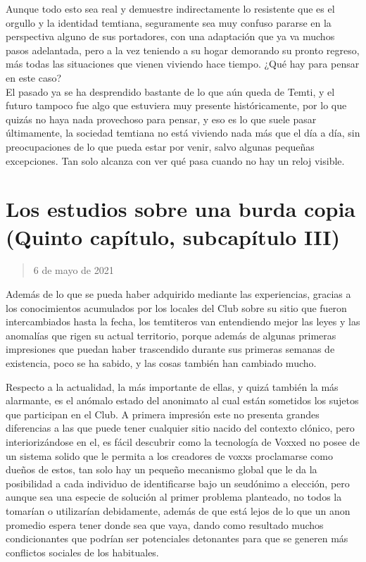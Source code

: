 \documentclass[
  spanish,
]{book}
\begin{document}
Aunque todo esto sea real y demuestre indirectamente lo resistente que es el orgullo y la identidad temtiana, seguramente sea muy confuso pararse en la perspectiva alguno de sus portadores, con una adaptación que ya va muchos pasos adelantada, pero a la vez teniendo a su hogar demorando su pronto regreso, más todas las situaciones que vienen viviendo hace tiempo. ¿Qué hay para pensar en este caso?\\
El pasado ya se ha desprendido bastante de lo que aún queda de Temti, y el futuro tampoco fue algo que estuviera muy presente históricamente, por lo que quizás no haya nada provechoso para pensar, y eso es lo que suele pasar últimamente, la sociedad temtiana no está viviendo nada más que el día a día, sin preocupaciones de lo que pueda estar por venir, salvo algunas pequeñas excepciones. Tan solo alcanza con ver qué pasa cuando no hay un reloj visible.

\hypertarget{los-estudios-sobre-una-burda-copia-quinto-capuxedtulo-subcapuxedtulo-iii}{%
\section{Los estudios sobre una burda copia (Quinto capítulo, subcapítulo III)}\label{los-estudios-sobre-una-burda-copia-quinto-capuxedtulo-subcapuxedtulo-iii}}

\begin{quote}
6 de mayo de 2021
\end{quote}

Además de lo que se pueda haber adquirido mediante las experiencias, gracias a los conocimientos acumulados por los locales del Club sobre su sitio que fueron intercambiados hasta la fecha, los temtiteros van entendiendo mejor las leyes y las anomalías que rigen su actual territorio, porque además de algunas primeras impresiones que puedan haber trascendido durante sus primeras semanas de existencia, poco se ha sabido, y las cosas también han cambiado mucho.

Respecto a la actualidad, la más importante de ellas, y quizá también la más alarmante, es el anómalo estado del anonimato al cual están sometidos los sujetos que participan en el Club. A primera impresión este no presenta grandes diferencias a las que puede tener cualquier sitio nacido del contexto clónico, pero interiorizándose en el, es fácil descubrir como la tecnología de Voxxed no posee de un sistema solido que le permita a los creadores de voxxs proclamarse como dueños de estos, tan solo hay un pequeño mecanismo global que le da la posibilidad a cada individuo de identificarse bajo un seudónimo a elección, pero aunque sea una especie de solución al primer problema planteado, no todos la tomarían o utilizarían debidamente, además de que está lejos de lo que un anon promedio espera tener donde sea que vaya, dando como resultado muchos condicionantes que podrían ser potenciales detonantes para que se generen más conflictos sociales de los habituales.
\end{document}
